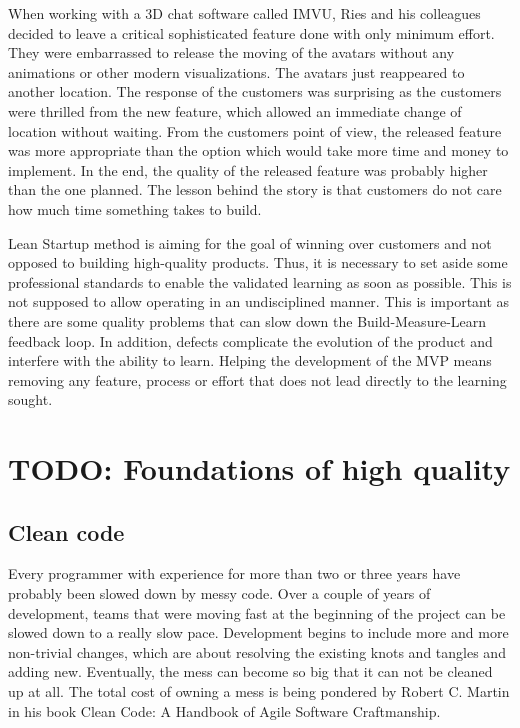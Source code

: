 When working with a 3D chat software called IMVU, Ries and his colleagues decided to leave a critical sophisticated feature done with only minimum effort. They were embarrassed to release the moving of the avatars without any animations or other modern visualizations. The avatars just reappeared to another location. The response of the customers was surprising as the customers were thrilled from the new feature, which allowed an immediate change of location without waiting. From the customers point of view, the released feature was more appropriate than the option which would take more time and money to implement. In the end, the quality of the released feature was probably higher than the one planned. The lesson behind the story is that customers do not care how much time something takes to build.

Lean Startup method is aiming for the goal of winning over customers and not opposed to building high-quality products. Thus, it is necessary to set aside some professional standards to enable the validated learning as soon as possible. This is not supposed to allow operating in an undisciplined manner. This is important as there are some quality problems that can slow down the Build-Measure-Learn feedback loop. In addition, defects complicate the evolution of the product and interfere with the ability to learn. Helping the development of the MVP means removing any feature, process or effort that does not lead directly to the learning sought.~\cite{ries2011lean}

\section{TODO: Foundations of high quality}

 \subsection{Clean code} 

 Every programmer with experience for more than two or three years have probably been slowed down by messy code. Over a couple of years of development, teams that were moving fast at the beginning of the project can be slowed down to a really slow pace. Development begins to include more and more non-trivial changes, which are about resolving the existing knots and tangles and adding new. Eventually, the mess can become so big that it can not be cleaned up at all. The total cost of owning a mess is being pondered by Robert C. Martin in his book Clean Code: A Handbook of Agile Software Craftmanship.

